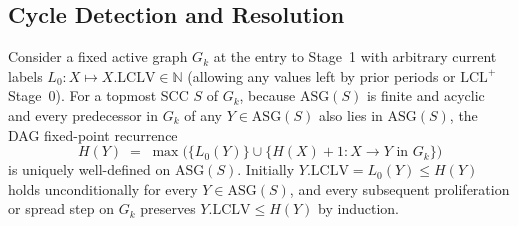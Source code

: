 \documentclass[sigconf,nonacm]{acmart}
\newcommand{\lclv}{\mathrm{LCLV}}
\newcommand{\asg}{\mathrm{ASG}}
\begin{document}
\subsection{Cycle Detection and Resolution}
\label{sec:resolution}
Consider a fixed active graph \(G_k\) at the entry to Stage~1 with
arbitrary current labels \(L_0:X\mapsto X.\lclv\in\mathbb{N}\) (allowing
any values left by prior periods or \(\text{LCL}^+\) Stage~0). For a
topmost SCC \(S\) of \(G_k\), because \(\asg(S)\) is finite and acyclic
and every predecessor in \(G_k\) of any \(Y\in\asg(S)\) also lies in
\(\asg(S)\), the DAG fixed-point recurrence
\[
  H(Y)\;=\;\max\bigl(\{L_0(Y)\}\cup\{H(X)+1 : X\to Y\text{ in }G_k\}\bigr)
\]
is uniquely well-defined on \(\asg(S)\). Initially \(Y.\lclv=L_0(Y)\le
H(Y)\) holds unconditionally for every \(Y\in\asg(S)\), and every
subsequent proliferation or spread step on \(G_k\) preserves
\(Y.\lclv\le H(Y)\) by induction.
\end{document}
